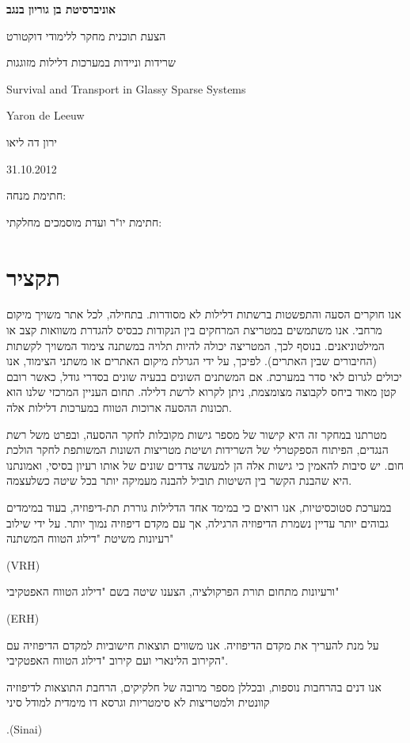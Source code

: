\documentclass[onecolumn,fleqn,12pt,openany,a4paper,longbibliography,oneside]{book}
\begin{document}
{\setlength{\parindent}{0cm}
\begin{center}

{\Huge\bfseries
אוניברסיטת בן גוריון בנגב


הצעת תוכנית מחקר ללימודי דוקטורט
\vspace{6em}



שרידות וניידות במערכות דלילות מזוגגות




\begin{english}

Survival and Transport in Glassy Sparse Systems

\vspace{2em}

Yaron de Leeuw
\end{english}

ירון דה ליאו


31.10.2012

}%
\end{center}
\vspace{8em}

חתימת מנחה: 
\underline{\hspace{20ex}}


חתימת יו"ר ועדת מוסמכים מחלקתי:
\underline{\hspace{20ex}}
}%
\newpage
\section*{תקציר}
אנו חוקרים הסעה והתפשטות ברשתות דלילות לא מסודרות. בתחילה, לכל אתר משויך מיקום מרחבי. 
אנו משתמשים במטריצת המרחקים בין הנקודות כבסיס להגדרת משוואות קצב או המילטוניאנים.
בנוסף לכך, המטריצה יכולה להיות תלויה במשתנה צימוד המשויך לקשתות (החיבורים שבין האתרים).
לפיכך, על ידי הגרלת מיקום האתרים או משתני הצימוד, אנו יכולים לגרום לאי סדר במערכת.
אם המשתנים השונים בבעיה שונים בסדרי גודל, כאשר רובם קטן מאוד ביחס לקבוצה מצומצמת, 
ניתן לקרוא לרשת דלילה. תחום העניין המרכזי שלנו הוא תכונות ההסעה ארוכות הטווח במערכות דלילות אלה.


מטרתנו במחקר זה היא קישור של מספר גישות מקובלות לחקר ההסעה,
ובפרט משל רשת הנגדים, הפיתוח הספקטרלי של השרידות
ושיטת מטריצות השונות המשותפת לחקר הולכת חום.
יש סיבות להאמין כי גישות אלה הן למעשה צדדים שונים
של אותו רעיון בסיסי, ואמונתנו היא שהבנת הקשר בין השיטות
תוביל להבנה מעמיקה יותר בכל שיטה כשלעצמה.


במערכת סטוכסיטיות, אנו
רואים כי במימד אחד הדלילות גוררת תת-דיפוזיה,
בעוד במימדים גבוהים יותר עדיין נשמרת הדיפוזיה הרגילה,
אך עם מקדם דיפוזיה נמוך יותר.
על ידי שילוב רעיונות משיטת "דילוג הטווח המשתנה" 
\begin{english}
(VRH)
\end{english}
ורעיונות מתחום תורת הפרקולציה,
הצענו שיטה בשם "דילוג הטווח האפטקיבי"
\begin{english}
(ERH)
\end{english}
 על מנת להעריך את מקדם הדיפוזיה.
אנו משווים תוצאות חישוביות למקדם הדיפוזיה עם הקירוב הלינארי ועם קירוב "דילוג הטווח האפטקיבי".



אנו דנים בהרחבות נוספות, ובכללן מספר מרובה של חלקיקים, 
הרחבת התוצאות לדיפוזיה קוונטית ולמטריצות לא סימטריות
וגרסא דו מימדית למודל סיני
\begin{english}
.(Sinai)
\end{english}
\end{document}
